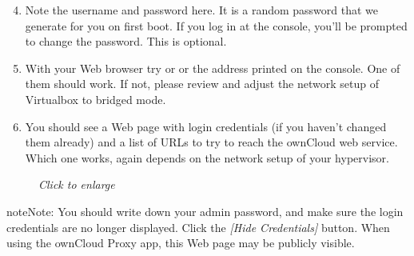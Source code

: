 \documentclass[letterpaper,10pt,english]{sphinxmanual}
\begin{document}
\begin{enumerate}
\setcounter{enumi}{3}
\item {} 
Note the username and password here. It is a random password that we generate
for you on first boot. If you log in at the console, you'll  be prompted to
change the password. This is optional.

\item {} 
With your Web browser try  or
 or the address printed on the console. One of them
should work. If not, please review and adjust the network setup of
Virtualbox to bridged mode.

\item {} 
You should see a Web page with login credentials (if you haven't changed
them already) and a list of URLs to try to reach the ownCloud web
service.  Which one works, again depends on the network setup of your
hypervisor.

\end{enumerate}
\begin{figure}[htbp]
\centering
\capstart

\caption{\emph{Click to enlarge}}\end{figure}

\begin{notice}{note}{Note:}
You should write down your admin password, and make sure the login
credentials are no longer displayed. Click the \emph{{[}Hide Credentials{]}} button.
When using the ownCloud Proxy app, this Web page may be publicly visible.
\end{notice}
\end{document}
